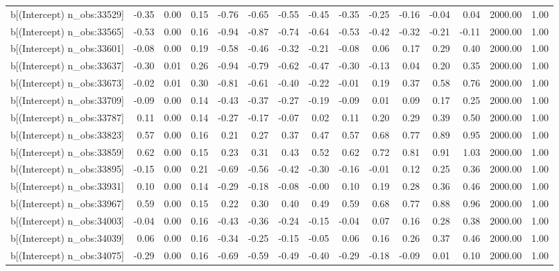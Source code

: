 \begin{table}[ht]
\begin{tabular}{rrrrrrrrrrrrrrr}
  b[(Intercept) n\_obs:33529] & -0.35 & 0.00 & 0.15 & -0.76 & -0.65 & -0.55 & -0.45 & -0.35 & -0.25 & -0.16 & -0.04 & 0.04 & 2000.00 & 1.00 \\ 
  b[(Intercept) n\_obs:33565] & -0.53 & 0.00 & 0.16 & -0.94 & -0.87 & -0.74 & -0.64 & -0.53 & -0.42 & -0.32 & -0.21 & -0.11 & 2000.00 & 1.00 \\ 
  b[(Intercept) n\_obs:33601] & -0.08 & 0.00 & 0.19 & -0.58 & -0.46 & -0.32 & -0.21 & -0.08 & 0.06 & 0.17 & 0.29 & 0.40 & 2000.00 & 1.00 \\ 
  b[(Intercept) n\_obs:33637] & -0.30 & 0.01 & 0.26 & -0.94 & -0.79 & -0.62 & -0.47 & -0.30 & -0.13 & 0.04 & 0.20 & 0.35 & 2000.00 & 1.00 \\ 
  b[(Intercept) n\_obs:33673] & -0.02 & 0.01 & 0.30 & -0.81 & -0.61 & -0.40 & -0.22 & -0.01 & 0.19 & 0.37 & 0.58 & 0.76 & 2000.00 & 1.00 \\ 
  b[(Intercept) n\_obs:33709] & -0.09 & 0.00 & 0.14 & -0.43 & -0.37 & -0.27 & -0.19 & -0.09 & 0.01 & 0.09 & 0.17 & 0.25 & 2000.00 & 1.00 \\ 
  b[(Intercept) n\_obs:33787] & 0.11 & 0.00 & 0.14 & -0.27 & -0.17 & -0.07 & 0.02 & 0.11 & 0.20 & 0.29 & 0.39 & 0.50 & 2000.00 & 1.00 \\ 
  b[(Intercept) n\_obs:33823] & 0.57 & 0.00 & 0.16 & 0.21 & 0.27 & 0.37 & 0.47 & 0.57 & 0.68 & 0.77 & 0.89 & 0.95 & 2000.00 & 1.00 \\ 
  b[(Intercept) n\_obs:33859] & 0.62 & 0.00 & 0.15 & 0.23 & 0.31 & 0.43 & 0.52 & 0.62 & 0.72 & 0.81 & 0.91 & 1.03 & 2000.00 & 1.00 \\ 
  b[(Intercept) n\_obs:33895] & -0.15 & 0.00 & 0.21 & -0.69 & -0.56 & -0.42 & -0.30 & -0.16 & -0.01 & 0.12 & 0.25 & 0.36 & 2000.00 & 1.00 \\ 
  b[(Intercept) n\_obs:33931] & 0.10 & 0.00 & 0.14 & -0.29 & -0.18 & -0.08 & -0.00 & 0.10 & 0.19 & 0.28 & 0.36 & 0.46 & 2000.00 & 1.00 \\ 
  b[(Intercept) n\_obs:33967] & 0.59 & 0.00 & 0.15 & 0.22 & 0.30 & 0.40 & 0.49 & 0.59 & 0.68 & 0.77 & 0.88 & 0.96 & 2000.00 & 1.00 \\ 
  b[(Intercept) n\_obs:34003] & -0.04 & 0.00 & 0.16 & -0.43 & -0.36 & -0.24 & -0.15 & -0.04 & 0.07 & 0.16 & 0.28 & 0.38 & 2000.00 & 1.00 \\ 
  b[(Intercept) n\_obs:34039] & 0.06 & 0.00 & 0.16 & -0.34 & -0.25 & -0.15 & -0.05 & 0.06 & 0.16 & 0.26 & 0.37 & 0.46 & 2000.00 & 1.00 \\ 
  b[(Intercept) n\_obs:34075] & -0.29 & 0.00 & 0.16 & -0.69 & -0.59 & -0.49 & -0.40 & -0.29 & -0.18 & -0.09 & 0.01 & 0.10 & 2000.00 & 1.00 \\ 

\end{tabular}
\end{table}
